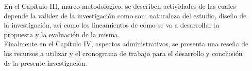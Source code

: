 En el Capítulo III, marco metodológico, se describen actividades de las cuales depende la validez de la investigación como son: naturaleza del estudio, diseño de la investigación, así como los lineamientos de cómo se va a desarrollar la propuesta y la evaluación de la misma.\\

Finalmente en el Capítulo IV, aspectos administrativos, se presenta una reseña de los recursos a utilizar y el cronograma de trabajo para el desarrollo y conclusión de la presente investigación.\\

